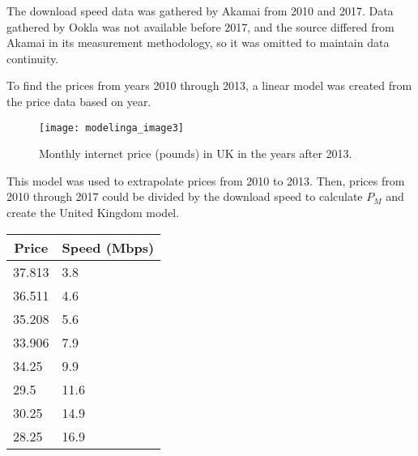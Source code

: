     The download speed data was gathered by Akamai from 2010 and 2017. Data gathered by Ookla was not available before 2017, and the source differed from Akamai in its measurement methodology, so it was omitted to maintain data continuity.

    To find the prices from years 2010 through 2013, a linear model was created from the price data based on year.

    \renewcommand{\thefigure}{3}
	\begin{figure}[htp]
    \centering
    \begin{minipage}{9cm}
    \texttt{[image: modelinga\_image3]}
    \caption{Monthly internet price (pounds) in UK in the years after 2013.}
    \label{fig:3}
    \end{minipage}
    \end{figure}
    
    This model was used to extrapolate prices from 2010 to 2013. Then, prices from 2010 through 2017 could be divided by the download speed to calculate $P_M$ and create the United Kingdom model.

\begin{center}
\begin{tabular}{|l|l|}
\hline
\multicolumn{1}{|c|}{Price}   & \multicolumn{1}{c|}{Speed (Mbps)} \\ \hline
{\color[HTML]{4472C4} 37.813} & 3.8                               \\ \hline
{\color[HTML]{4472C4} 36.511} & 4.6                               \\ \hline
{\color[HTML]{4472C4} 35.208} & 5.6                               \\ \hline
{\color[HTML]{4472C4} 33.906} & 7.9                               \\ \hline
34.25                         & 9.9                               \\ \hline
29.5                          & 11.6                              \\ \hline
30.25                         & 14.9                              \\ \hline
28.25                         & 16.9                              \\ \hline
\end{tabular}
\end{center}

